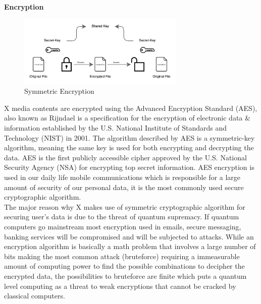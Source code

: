\documentclass[letterpaper,11pt]{article}
\begin{document}
\textbf{Encryption}\\

\begin{figure}[H]
\begin{center}
\includegraphics[width=8cm]{aes}
\caption{Symmetric Encryption}
\end{center}
\end{figure}

X media contents are encrypted using the Advanced Encryption Standard (AES), also known as Rijndael is a specification for the encryption of electronic data \& information established by the U.S. National Institute of Standards and Technology (NIST) in 2001. The algorithm described by AES is a symmetric-key algorithm, meaning the same key is used for both encrypting and decrypting the data. AES is the first publicly accessible cipher approved by the U.S. National Security Agency (NSA) for encrypting top secret information. AES encryption is used in our daily life mobile communications which is responsible for a large amount of security of our personal data, it is the most commonly used secure cryptographic algorithm.\\

The major reason why X makes use of symmetric cryptographic algorithm for securing user's data is due to the threat of quantum supremacy. If quantum computers go mainstream most encryption used in emails, secure messaging, banking services will be compromised and will be subjected to attacks. While an encryption algorithm is basically a math problem that involves a large number of bits making the most common attack (bruteforce) requiring a immeasurable amount of computing power to find the possible combinations to decipher the encrypted data, the possibilities to bruteforce are finite which puts a quantum level computing as a threat to weak encryptions that cannot be cracked by classical computers.\\
\end{document}
